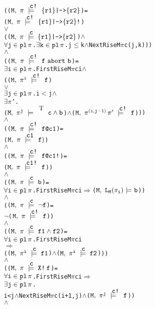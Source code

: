 \documentclass{llncs}
\makeatletter
\newcommand{\And}{\(\wedge\)}
\newcommand{\Or}{\(\vee\)}
\newcommand{\Imp}{\(\Rightarrow\)}
\newcommand{\Not}{\(\neg\)}
\newcommand{\Exists}{\(\exists\)}
\newcommand{\pathCat}[2]{#1\hspace*{0.5mm}#2}
\newcommand{\Leq}{\(\leq\)}
\newcommand{\Le}{\(<\)}
\newcommand{\T}{\texttt{\small\rm{T}}}
\renewcommand{\Pi}{\(\pi\)}
\newcommand{\BSem}[3]{(\(\tt#1,~#2~{\models}~#3\))}
\newcommand{\FSem}[4]{(\(\tt{#1,~#2~\models^{\hspace*{-2.3mm}\raisebox{1mm}{\tt#3}}~#4}\))}
\newcommand{\pl}{\texttt{pl}\xspace}
\newcommand{\ResExists}[2]{\(\exists{\tt#1}\in\pl\hspace*{0.5mm}#2\)}
\newcommand{\ResForall}[2]{\(\forall{\tt#1}\in\pl\hspace*{0.5mm}#2\)}
\newcommand{\FBool}[1]{#1}
\newcommand{\fNot}[1]{\neg#1}
\newcommand{\weakClock}[1]{#1}
\newcommand{\strongClock}[1]{#1!}
\newcommand{\restN}[2]{#1^{#2}}
\newcommand{\pathEl}[2]{#1_{#2}}
\newcommand{\pathSeg}[2]{#1^{#2}}
\newcommand{\lNoHat}[1]{{\texttt{L}}_{#1}}
\newcommand{\bAnd}[2]{#1\wedge#2}
\newcommand{\fAnd}[2]{#1 \wedge #2}
\newcommand{\fNext}[1]{\texttt{X!}\hspace*{0.8mm}#1}
\newcommand{\fStrongImp}[2]{\{#1\}\texttt{|->}\{#2\}\texttt{!}}
\newcommand{\fWeakImp}[2]{\{#1\}\texttt{|->}\{#2\}}
\newcommand{\fAbort}[2]{#1~\texttt{abort}~#2}
\newcommand{\fWeakClock}[2]{#1\texttt{@}#2}
\newcommand{\fStrongClock}[2]{#1\texttt{@}#2\texttt{!}}
\makeatother
\begin{document}
{\begin{alltt}
    ({\FSem{M}{{\pi}}{{\strongClock{c}}}{\fWeakImp{r1}{r2}}} = 
     {\FSem{M}{{\pi}}{{\strongClock{c}}}{\fStrongImp{r1}{r2}}}
     {\Or}
     ({\FSem{M}{{\pi}}{{\weakClock{c}}}{\fWeakImp{r1}{r2}}} {\And}
       {\ResForall{j}{\pi}}. {\ResExists{k}{\pi}}. j {\Leq} k \And NextRise M {\Pi} c (j,k)))
    {\And}
    ({\FSem{M}{{\pi}}{{\strongClock{c}}}{\fAbort{f}{b}}} =
      {\ResExists{i}{\pi}}. FirstRise M {\Pi} c i {\And}
                ({\FSem{M}{\restN{{\pi}}{i}}{{\strongClock{c}}}{f }}
                 {\Or}
                 {\ResExists{j}{\pi}}. i \Le j \And 
                   \Exists{\Pi}'. 
                    {\FSem{M}{\restN{{\pi}}{j}}{\weakClock{\T}}{{\FBool{\bAnd{c}{b}}}}} {\And} {\FSem{M}{\pathCat{\pathSeg{\pi}{(i,j-1)}}{{\pi}'}}{{\strongClock{c}}}{f}}))
    {\And}
    ({\FSem{M}{{\pi}}{{\strongClock{c}}}{\fWeakClock{f}{c1}}} =   
      {\FSem{M}{{\pi}}{{\weakClock{c1}}}{f)}}
    {\And}
    ({\FSem{M}{{\pi}}{{\strongClock{c}}}{\fStrongClock{f}{c1}}} =   
      {\FSem{M}{{\pi}}{{\strongClock{c1}}}{f}})
    {\And}
    ({\FSem{M}{{\pi}}{{\weakClock{c}}}{{\FBool{b}}}} = 
      {\ResForall{i}{\pi}}. FirstRise M {\Pi} c i {\Imp} {\BSem{M}{\lNoHat{M}(\pathEl{{\pi}}{i})}{b}})
    {\And}
    ({\FSem{M}{{\pi}}{{\weakClock{c}}}{\fNot{f}}} = 
      {\Not}{\FSem{M}{{\pi}}{{\strongClock{c}}}{f}}) 
    {\And}
    ({\FSem{M}{{\pi}}{{\weakClock{c}}}{\fAnd{f1}{f2}}} = 
       {\ResForall{i}{\pi}}. FirstRise M {\Pi} c i
                 {\Imp}
                 ({\FSem{M}{\restN{{\pi}}{i}}{{\weakClock{c}}}{f1}} {\And} {\FSem{M}{\restN{{\pi}}{i}}{{\weakClock{c}}}{f2}}))
    {\And}
    ({\FSem{M}{{\pi}}{{\weakClock{c}}}{\fNext{f}}} = 
      {\ResForall{i}{\pi}}. FirstRise M {\Pi} c i {\Imp} 
                \ResExists{j}{\pi}. 
                  i < j \And NextRise M {\Pi} c (i+1,j) \And {\FSem{M}{\restN{{\pi}}{j}}{{\strongClock{c}}}{f}})
    {\And}







\end{alltt}}
\end{document}
